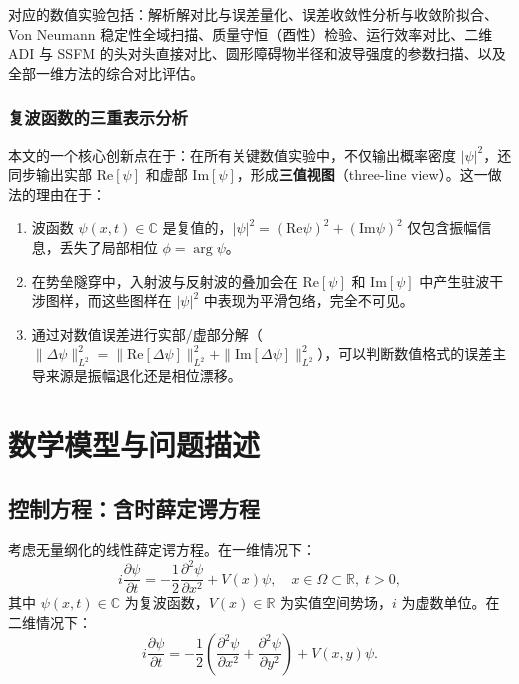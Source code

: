 \documentclass[12pt,a4paper]{article}
\begin{document}
对应的数值实验包括：解析解对比与误差量化、误差收敛性分析与收敛阶拟合、Von Neumann 稳定性全域扫描、质量守恒（酉性）检验、运行效率对比、二维 ADI 与 SSFM 的头对头直接对比、圆形障碍物半径和波导强度的参数扫描、以及全部一维方法的综合对比评估。

\subsubsection{复波函数的三重表示分析}

本文的一个核心创新点在于：在所有关键数值实验中，不仅输出概率密度 $|\psi|^2$，还同步输出实部 $\mathrm{Re}[\psi]$ 和虚部 $\mathrm{Im}[\psi]$，形成\textbf{三值视图}（three-line view）。这一做法的理由在于：
\begin{enumerate}
    \item 波函数 $\psi(x,t) \in \mathbb{C}$ 是复值的，$|\psi|^2 = (\mathrm{Re}\psi)^2 + (\mathrm{Im}\psi)^2$ 仅包含振幅信息，丢失了局部相位 $\phi = \arg\psi$。
    \item 在势垒隧穿中，入射波与反射波的叠加会在 $\mathrm{Re}[\psi]$ 和 $\mathrm{Im}[\psi]$ 中产生驻波干涉图样，而这些图样在 $|\psi|^2$ 中表现为平滑包络，完全不可见。
    \item 通过对数值误差进行实部/虚部分解（$\|\Delta\psi\|_{L^2}^2 = \|\mathrm{Re}[\Delta\psi]\|_{L^2}^2 + \|\mathrm{Im}[\Delta\psi]\|_{L^2}^2$），可以判断数值格式的误差主导来源是振幅退化还是相位漂移。
\end{enumerate}

\section{数学模型与问题描述}

\subsection{控制方程：含时薛定谔方程}

考虑无量纲化的线性薛定谔方程。在一维情况下：
\begin{equation}\label{eq:tdse1d}
    i\frac{\partial \psi}{\partial t}
    = -\frac{1}{2}\frac{\partial^2 \psi}{\partial x^2} + V(x)\psi,
    \quad x \in \Omega \subset \mathbb{R}, \; t > 0,
\end{equation}
其中 $\psi(x,t) \in \mathbb{C}$ 为复波函数，$V(x) \in \mathbb{R}$ 为实值空间势场，$i$ 为虚数单位。在二维情况下：
\begin{equation}\label{eq:tdse2d}
    i\frac{\partial \psi}{\partial t}
    = -\frac{1}{2}\left(\frac{\partial^2\psi}{\partial x^2} + \frac{\partial^2\psi}{\partial y^2}\right)
    + V(x,y)\psi.
\end{equation}
\end{document}
